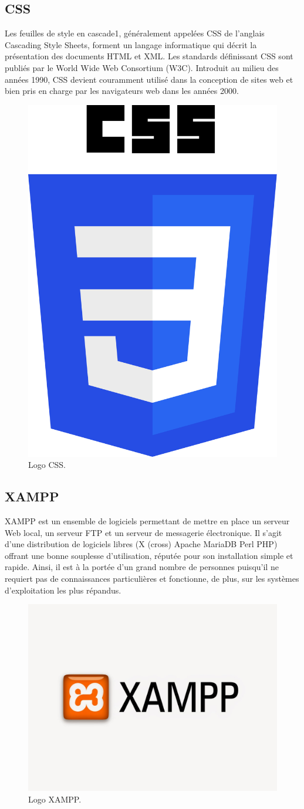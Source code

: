 \documentclass[12pt,a4paper]{report}
\begin{document}
\subsection{CSS}
Les feuilles de style en cascade1, généralement appelées CSS de l'anglais Cascading Style Sheets, forment un langage informatique qui décrit la présentation des documents HTML et XML. Les standards définissant CSS sont publiés par le World Wide Web Consortium (W3C). Introduit au milieu des années 1990, CSS devient couramment utilisé dans la conception de sites web et bien pris en charge par les navigateurs web dans les années 2000.
\begin{figure}[H]
	\centering
	\includegraphics[width=0.3\linewidth]{css}
	\caption{Logo CSS.}
	
\end{figure}

\subsection{XAMPP}
XAMPP est un ensemble de logiciels permettant de mettre en place un serveur Web local, un serveur FTP et un serveur de messagerie électronique. Il s'agit d'une distribution de logiciels libres (X (cross) Apache MariaDB Perl PHP) offrant une bonne souplesse d'utilisation, réputée pour son installation simple et rapide. Ainsi, il est à la portée d'un grand nombre de personnes puisqu'il ne requiert pas de connaissances particulières et fonctionne, de plus, sur les systèmes d'exploitation les plus répandus.
\begin{figure}[H]
	\centering
	\includegraphics[width=0.3\linewidth]{xampp}
	\caption{Logo XAMPP.}
	
\end{figure}

\newpage
 

\end{document}
